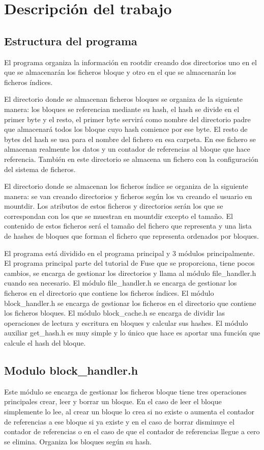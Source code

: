 \documentclass[a4paper,12pt]{article}
\begin{document}
\section{Descripción del trabajo}

\subsection{Estructura del programa}
El programa organiza la información en rootdir creando dos directorios uno en el que se almacenarán los ficheros bloque y otro en el que se almacenarán los ficheros índices.
\bigskip

El directorio donde se almacenan ficheros bloques se organiza de la siguiente manera: los bloques se referencian mediante su hash, el hash se divide en el primer byte y el resto, el primer byte servirá como nombre del directorio padre que almacenará todos los bloque cuyo hash comience por ese byte. El resto de bytes del hash se usa para el nombre del fichero en esa carpeta. En ese fichero se almacenan realmente los datos y un contador de referencias al bloque que hace referencia. También en este directorio se almacena un fichero con la configuración del sistema de ficheros.
\bigskip

El directorio donde se almacenan los ficheros índice se organiza de la siguiente manera: se van creando directorios y ficheros según los va creando el usuario en mountdir. Los atributos de estos ficheros y directorios serán los que se correspondan con los que se muestran en mountdir excepto el tamaño. El contenido de estos ficheros será el tamaño del fichero que representa y una lista de hashes de bloques que forman el fichero que representa ordenados por bloques.
\bigskip

El programa está dividido en el programa principal y 3 módulos principalmente. El programa principal parte del tutorial de Fuse que se proporciona, tiene pocos cambios, se encarga de gestionar los directorios y llama al módulo file\_handler.h cuando sea necesario. El módulo file\_handler.h se encarga de gestionar los ficheros en el directorio que contiene los ficheros índices. El módulo block\_handler.h se encarga de gestionar los ficheros en el directorio que contiene los ficheros bloques. El módulo block\_cache.h se encarga de dividir las operaciones de lectura y escritura en bloques y calcular sus hashes. El módulo auxiliar get\_hash.h es muy simple y lo único que hace es aportar una función que calcule el hash del bloque.

\subsection{Modulo block\_handler.h}
Este módulo se encarga de gestionar los ficheros bloque tiene tres operaciones principales crear, leer y borrar un bloque. En el caso de leer el bloque simplemente lo lee, al crear un bloque lo crea si no existe o aumenta el contador de referencias a ese bloque si ya existe y en el caso de borrar disminuye el contador de referencias o en el caso de que el contador de referencias llegue a cero se elimina. Organiza los bloques según su hash.
\bigskip
\end{document}
